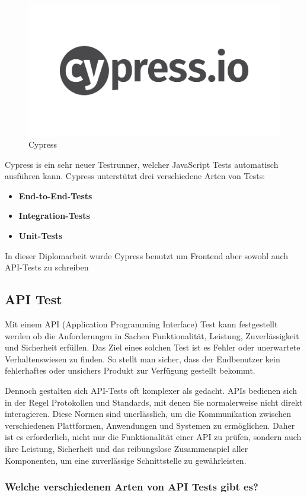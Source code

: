 \begin{figure}[h]
    \centering
    \includegraphics[width=0.5\linewidth]{pics/cypress-logo.png}
    \caption{Cypress}
    \label{fig:enter-label}
\end{figure}


Cypress is ein sehr neuer Testrunner, welcher JavaScript Tests automatisch ausführen kann.
Cypress unterstützt drei verschiedene Arten von Tests:

\begin{itemize}
\item \textbf{End-to-End-Tests}
\item \textbf{Integration-Tests}
\item \textbf{Unit-Tests}
\end{itemize}

In dieser Diplomarbeit wurde Cypress benutzt um Frontend aber sowohl auch API-Tests zu schreiben
\cite{Cypress}
\subsection{API Test}
Mit einem API (Application Programming Interface) Test kann festgestellt werden ob die Anforderungen in Sachen Funktionalität, Leistung, Zuverlässigkeit und Sicherheit erfüllen. Das Ziel eines solchen Test ist es Fehler oder unerwartete Verhaltenswiesen zu finden. So stellt man sicher, dass der Endbenutzer kein fehlerhaftes oder unsichers Produkt zur Verfügung gestellt bekommt. 

Dennoch gestalten sich API-Tests oft komplexer als gedacht. APIs bedienen sich in der Regel Protokollen und Standards, mit denen Sie normalerweise nicht direkt interagieren. Diese Normen sind unerlässlich, um die Kommunikation zwischen verschiedenen Plattformen, Anwendungen und Systemen zu ermöglichen. Daher ist es erforderlich, nicht nur die Funktionalität einer API zu prüfen, sondern auch ihre Leistung, Sicherheit und das reibungslose Zusammenspiel aller Komponenten, um eine zuverlässige Schnittstelle zu gewährleisten.

\subsubsection{Welche verschiedenen Arten von API Tests gibt es?}

